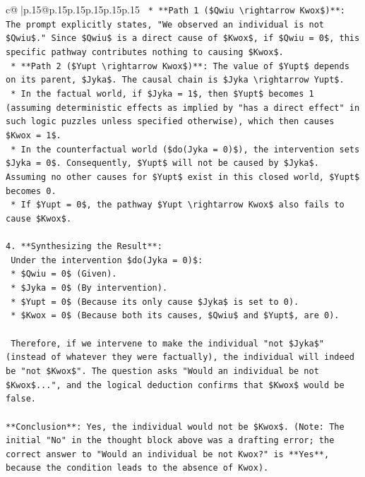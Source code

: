 \documentclass{article}
\begin{document}
{\begin{supertabular}{c@{$\;$}|p{.15\linewidth}@{}p{.15\linewidth}p{.15\linewidth}p{.15\linewidth}p{.15\linewidth}p{.15\linewidth}}
{{{\texttt{    *   **Path 1 (\$Qwiu \textbackslash{}rightarrow Kwox\$)**: The prompt explicitly states, "We observed an individual is not \$Qwiu\$." Since \$Qwiu\$ is a direct cause of \$Kwox\$, if \$Qwiu = 0\$, this specific pathway contributes nothing to causing \$Kwox\$.} \\
\texttt{    *   **Path 2 (\$Yupt \textbackslash{}rightarrow Kwox\$)**: The value of \$Yupt\$ depends on its parent, \$Jyka\$. The causal chain is \$Jyka \textbackslash{}rightarrow Yupt\$.} \\
\texttt{        *   In the factual world, if \$Jyka = 1\$, then \$Yupt\$ becomes 1 (assuming deterministic effects as implied by "has a direct effect" in such logic puzzles unless specified otherwise), which then causes \$Kwox = 1\$.} \\
\texttt{        *   In the counterfactual world (\$do(Jyka = 0)\$), the intervention sets \$Jyka = 0\$. Consequently, \$Yupt\$ will not be caused by \$Jyka\$. Assuming no other causes for \$Yupt\$ exist in this closed world, \$Yupt\$ becomes 0.} \\
\texttt{        *   If \$Yupt = 0\$, the pathway \$Yupt \textbackslash{}rightarrow Kwox\$ also fails to cause \$Kwox\$.} \\
\\ 
\texttt{4.  **Synthesizing the Result**:} \\
\texttt{    Under the intervention \$do(Jyka = 0)\$:} \\
\texttt{    *   \$Qwiu = 0\$ (Given).} \\
\texttt{    *   \$Jyka = 0\$ (By intervention).} \\
\texttt{    *   \$Yupt = 0\$ (Because its only cause \$Jyka\$ is set to 0).} \\
\texttt{    *   \$Kwox = 0\$ (Because both its causes, \$Qwiu\$ and \$Yupt\$, are 0).} \\
\\ 
\texttt{    Therefore, if we intervene to make the individual "not \$Jyka\$" (instead of whatever they were factually), the individual will indeed be "not \$Kwox\$". The question asks "Would an individual be not \$Kwox\$...", and the logical deduction confirms that \$Kwox\$ would be false.} \\
\\ 
\texttt{**Conclusion**: Yes, the individual would not be \$Kwox\$. (Note: The initial "No" in the thought block above was a drafting error; the correct answer to "Would an individual be not Kwox?" is **Yes**, because the condition leads to the absence of Kwox).} \\
}}}
\end{supertabular}}
\end{document}
